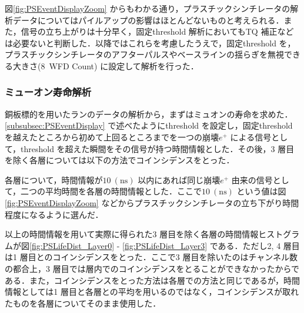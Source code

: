 図\ref{fig:PSEventDisplayZoom} からもわかる通り，プラスチックシンチレータの解析データについてはパイルアップの影響はほとんどないものと考えられる．また，信号の立ち上がりは十分早く，固定threshold 解析においてもTQ 補正などは必要ないと判断した．以降ではこれらを考慮したうえで，固定threshold を，プラスチックシンチレータのアフターパルスやベースラインの揺らぎを無視できる大きさ(8~WFD Count) に設定して解析を行った．

\subsubsection{ミューオン寿命解析}
\label{subsubsec:PSLife}
銅板標的を用いたランのデータの解析から，まずはミュオンの寿命を求めた．\ref{subsubsec:PSEventDisplay} で述べたようにthreshold を設定し，固定threshold を越えたところから初めて上回るところまでを一つの崩壊$e^{+}$ による信号として，threshold を超えた瞬間をその信号が持つ時間情報とした．その後，3 層目を除く各層については以下の方法でコインシデンスをとった．

各層について，時間情報が$10~(\mathrm{ns})$ 以内にあれば同じ崩壊$e^{+}$ 由来の信号として，二つの平均時間を各層の時間情報とした．ここで$10~(\mathrm{ns})$ という値は図\ref{fig:PSEventDisplayZoom} などからプラスチックシンチレータの立ち下がり時間程度になるように選んだ．

以上の時間情報を用いて実際に得られた3 層目を除く各層の時間情報ヒストグラムが図\ref{fig:PSLifeDist_Layer0} - \ref{fig:PSLifeDist_Layer3} である．ただし2, 4 層目は1 層目とのコインシデンスをとった．ここで3 層目を除いたのはチャンネル数の都合上，3 層目では層内でのコインシデンスをとることができなかったからである．また，コインシデンスをとった方法は各層での方法と同じであるが，時間情報としては1 層目と各層との平均を用いるのではなく，コインシデンスが取れたものを各層についてそのまま使用した．

